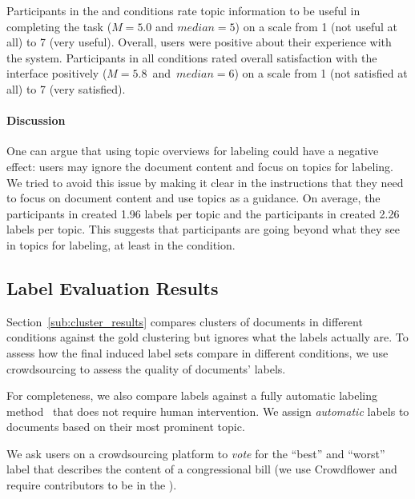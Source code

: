 Participants in the  and  conditions rate topic
information to be useful in completing the task (\mbox{$M=5.0$} and
\mbox{$median=5$}) on a scale from 1 (not useful at all) to 7 (very
useful).  Overall, users were positive about their experience with the
system. Participants in all conditions rated overall satisfaction
with the interface positively (\mbox{$M=5.8$ and $median=6$}) on a
scale from 1 (not satisfied at all) to 7 (very satisfied).
\paragraph{Discussion}

One can argue that using topic overviews for labeling could have a negative effect:
users may ignore the document content and focus on topics for labeling. We tried
to avoid this issue by making it clear in the instructions that they need to
focus on document content and use topics as a guidance. On average, the participants in
 created 1.96 labels per topic and the participants in  created
2.26 labels per topic. This suggests that participants are going beyond what
they see in topics for labeling, at least in the  condition.









\subsection{Label Evaluation Results}
\label{sub:label_results}

Section~\ref{sub:cluster_results} compares clusters of documents in different
conditions against the gold clustering but ignores what the labels
actually are. To assess how the final induced label sets compare in
different conditions, we use crowdsourcing to assess the quality of
documents' labels.  

For completeness, we also compare labels against a fully automatic
labeling method~\cite{aletras2014labelling} that does not require
human intervention.  We assign \emph{automatic} labels to documents
based on their most prominent topic.

We ask users on a crowdsourcing platform to \emph{vote} for the ``best'' and
``worst'' label that describes the content of a  congressional
bill (we use Crowdflower and require contributors to be in the ).

